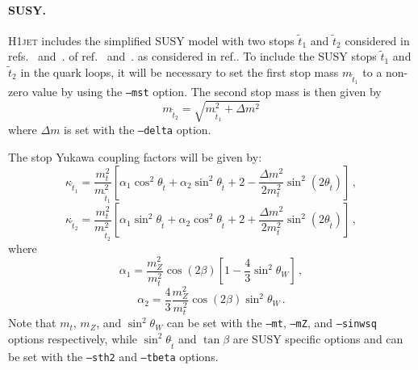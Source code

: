 \documentclass[12pt]{article}
\begin{document}
\paragraph{SUSY.} \textsc{H1jet} includes the simplified SUSY model with
two stops $\tilde{t}_1$ and $\tilde{t}_2$ considered in refs.~\cite{Gunion:2002zf} and~\cite{Banfi:2018pki}.  of ref.~\cite{Gunion:2002zf} and~\cite{Banfi:2018pki}. as considered in
ref.\cite{Banfi:2018pki}. To include the SUSY stops $\tilde{t}_1$ and
$\tilde{t}_2$ in the quark loops, it will be necessary to set the
first stop mass $m_{\tilde{t}_1}$ to a non-zero value by using the
\texttt{--mst} option. The second stop mass is then given by
\begin{equation}
	m_{\tilde{t}_2} = \sqrt{m_{\tilde{t}_1}^2 + \Delta m^2} 
\end{equation}
where $\Delta m$ is set with the \texttt{--delta} option. 

The stop Yukawa coupling factors will be given by: 
\begin{equation}
   \kappa_{\tilde{t}_1} = \frac{m_t^2}{m_{\tilde{t}_1}^2} \left [ \alpha_1 \cos^2 \theta_{\tilde{t}} + \alpha_2 \sin^2 \theta_{\tilde{t}} + 2 - \frac{\Delta m^2}{2 m_t^2} \sin^2\left ( 2 \theta_{\tilde{t}} \right ) \right ] \,,
\end{equation} 
\begin{equation}
   \kappa_{\tilde{t}_2} = \frac{m_t^2}{m_{\tilde{t}_2}^2} \left [ \alpha_1 \sin^2 \theta_{\tilde{t}} + \alpha_2 \cos^2 \theta_{\tilde{t}} + 2 + \frac{\Delta m^2}{2 m_t^2} \sin^2\left ( 2 \theta_{\tilde{t}} \right ) \right ] \,, 
\end{equation} 
where 
\begin{equation}
   \alpha_1 = \frac{m_Z^2}{m_t^2} \cos \left ( 2 \beta \right ) \left [ 1 - \frac{4}{3} \sin^2\theta_W \right ] \,, 
\end{equation} 
\begin{equation}
   \alpha_2 = \frac{4}{3} \frac{m_Z^2}{m_t^2} \cos \left ( 2 \beta \right ) \sin^2\theta_W \,. 
\end{equation} 
Note that $m_t$, $m_Z$, and $\sin^2\theta_W$ can be set with the \texttt{--mt}, \texttt{--mZ}, and \texttt{--sinwsq} options respectively, while $\sin^2 \theta_{\tilde{t}}$ and $\tan\beta$ are SUSY specific options and can be set with the \texttt{--sth2} and \texttt{--tbeta} options. 
\end{document}
